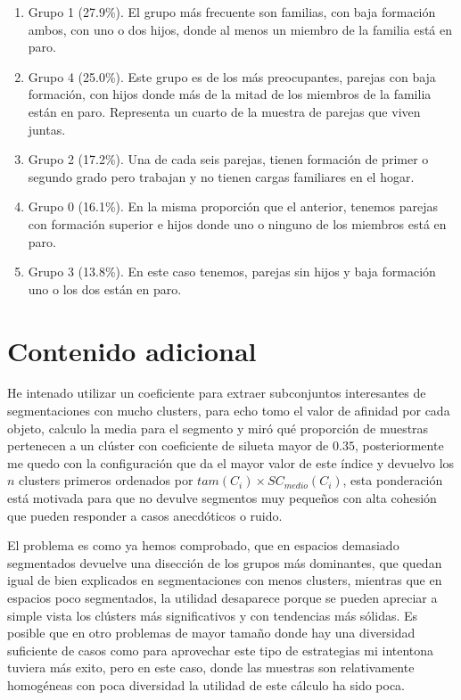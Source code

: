 \documentclass{article}
\begin{document}
\begin{enumerate}
\item Grupo 1 (27.9\%). El grupo más frecuente son familias, con baja formación ambos, con uno o dos hijos, donde al menos un miembro de la familia está en paro.
\item Grupo 4 (25.0\%). Este grupo es de los más preocupantes, parejas con baja formación, con hijos donde más de la mitad de los miembros de la familia están en paro. Representa un cuarto de la muestra de parejas que viven juntas.
\item Grupo 2 (17.2\%). Una de cada seis parejas, tienen formación de primer o segundo grado pero trabajan y no tienen cargas familiares en el hogar.
\item Grupo 0 (16.1\%). En la misma proporción que el anterior, tenemos parejas con formación superior e hijos donde uno o ninguno de los miembros está en paro.
\item Grupo 3 (13.8\%). En este caso tenemos, parejas sin hijos y baja formación uno o los dos están en paro.
\end{enumerate}

\section{Contenido adicional}

He intenado utilizar un coeficiente para extraer subconjuntos interesantes de segmentaciones con mucho clusters, para echo tomo el valor de afinidad por cada objeto, calculo la media para el segmento y miró qué proporción de muestras pertenecen a un clúster con coeficiente de silueta mayor de $0.35$, posteriormente me quedo con la configuración que da el mayor valor de este índice y devuelvo los $n$ clusters primeros ordenados por $tam(C_i)\times SC_{medio}(C_i)$, esta ponderación está motivada para que no devulve segmentos muy pequeños con alta cohesión que pueden responder a casos anecdóticos o ruido. 

El problema es como ya hemos comprobado, que en espacios demasiado segmentados devuelve una disección de los grupos más dominantes, que quedan igual de bien explicados en segmentaciones con menos clusters, mientras que en espacios poco segmentados, la utilidad desaparece porque se pueden apreciar a simple vista los clústers más significativos y con tendencias más sólidas. Es posible que en otro problemas de mayor tamaño donde hay una diversidad suficiente de casos como para aprovechar este tipo de estrategias mi intentona tuviera más exito, pero en este caso, donde las muestras son relativamente homogéneas con poca diversidad la utilidad de este cálculo ha sido poca.
\end{document}
